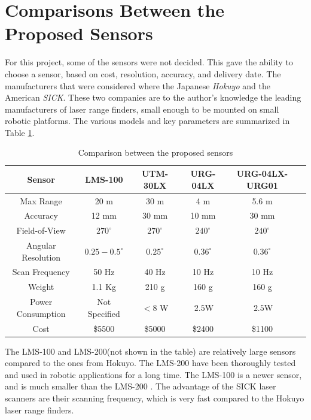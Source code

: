 \section{Comparisons Between the Proposed Sensors}
For this project, some of the sensors were not decided. This gave the ability to choose a
sensor, based on cost, resolution, accuracy, and delivery date. The manufacturers that were
considered where the Japanese \emph{Hokuyo} and the American \emph{SICK}. These two companies are to the
author's knowledge the leading manufacturers of laser range finders, small enough to be
mounted on small robotic platforms. The various models and key parameters are summarized
in Table \ref{chap3:tab-sensors}.
\begin{table}[htbp]
    \begin{tabular}{|c|c|c|c|c|c|}
        \hline
        Sensor              & LMS-100 & UTM-30LX & URG-04LX & URG-04LX-URG01 \\
        \hline
        Max Range           & 20 m    & 30 m     & 4 m      & 5.6 m          \\
        Accuracy            & 12 mm   & 30 mm    & 10 mm    & 30 mm          \\
        Field-of-View       & $270^\circ$& $270^\circ$ & $240^\circ$ & $240^\circ$  \\
        Angular Resolution  & $0.25-0.5^\circ$  & $0.25^\circ$ & $0.36^\circ$ & $0.36^\circ$  \\
        Scan Frequency      & 50 Hz   &  40 Hz   & 10 Hz    & 10 Hz          \\
        Weight              & 1.1 Kg  &  210 g    & 160 g    & 160 g          \\
        Power Consumption   & Not Specified  & $<8 $ W & $~2.5$W  &$~2.5$W  \\
        \hline
        Cost                & \$5500  & \$5000   & \$2400   & \$1100         \\
        \hline
    \end{tabular}
    \caption{Comparison between the proposed sensors}
    \label{chap3:tab-sensors}
\end{table}

The LMS-100 and LMS-200(not shown in the table) are relatively large sensors compared to
the ones from Hokuyo. The LMS-200 have been thoroughly tested and used in robotic
applications for a long time. The LMS-100 is a newer sensor, and is much smaller than the
LMS-200 \cite{SICKweb}. The advantage of the SICK laser scanners are their scanning
frequency, which is very fast compared to the Hokuyo laser range finders.

